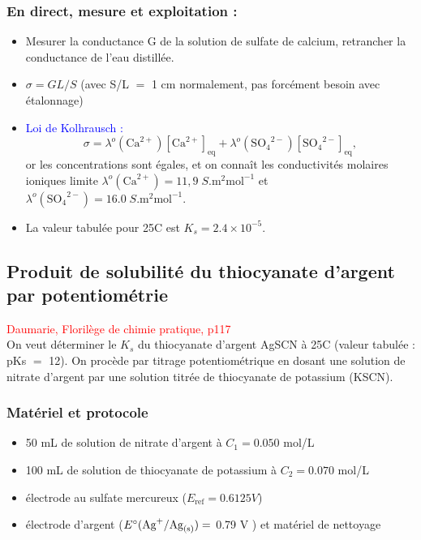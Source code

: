 \documentclass[11pt,a4paper]{report}
\begin{document}
\subsubsection{En direct, mesure et exploitation :}	
\begin{itemize}
	\item Mesurer la conductance G de la solution de sulfate de calcium, retrancher la conductance 				de l'eau distillée.
	\item  $\sigma = G L/S$ (avec S/L $=$ 1 cm normalement, pas forcément besoin avec étalonnage)\\
	\item \textcolor{blue}{Loi de Kolhrausch :}
	\begin{equation}
		\sigma = \lambda^o(\text{Ca}^{2+})[\text{Ca}^{2+}]_\text{eq} 
		+ \lambda^o({\text{SO}_4}^{2-})[{\text{SO}_4}^{2-}]_\text{eq},
	\end{equation}
	or les concentrations sont égales, et on connaît les conductivités molaires ioniques limite
	$\lambda^o(\text{Ca}^{2+}) = 11,9\;S.\text{m}^2\text{mol}^{-1}$ 
	et $\lambda^o({\text{SO}_4}^{2-}) = 16.0\;S.\text{m}^2\text{mol}^{-1}$.\\
	
	\item La valeur tabulée pour 25\degree C est $K_s = 2.4\times10^{-5}$.
\end{itemize}

\newpage
\subsection{Produit de solubilité du thiocyanate d'argent par potentiométrie}
\textcolor{red}{Daumarie, Florilège de chimie pratique, p117}\\

On veut déterminer le $K_s$ du thiocyanate d'argent AgSCN à 25\degree C (valeur tabulée : pKs $=$ 12). On procède par titrage potentiométrique en dosant une solution de nitrate d'argent par une solution titrée de thiocyanate de potassium (KSCN).\\

\subsubsection*{Matériel et protocole}
\begin{itemize}
	\item 50 mL de solution de nitrate d'argent à $C_1 = 0.050$ mol/L
	\item 100 mL de solution de thiocyanate de potassium à $C_2 = 0.070$ mol/L
	\item électrode au sulfate mercureux ($E_\text{ref} = 0.6125 V$)
	\item électrode d'argent ($E\degree(\text{Ag}^+/\text{Ag}_\text{(s)}) =$ 0.79 V ) 
		et matériel de nettoyage
\end{itemize}
\end{document}
